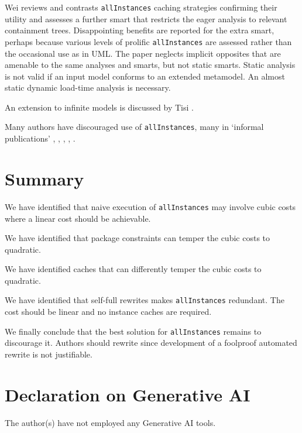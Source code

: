 \documentclass[
]{ceurart}
\begin{document}
Wei \cite{wei2015efficient} reviews and contrasts \verb!allInstances! caching strategies confirming their utility and assesses a further smart that restricts the eager analysis to relevant containment trees. Disappointing benefits are reported for the extra smart, perhaps because various levels of prolific \verb!allInstances! are assessed rather than the occasional use as in UML. The paper neglects implicit opposites that are amenable to the same analyses and smarts, but not static smarts. Static analysis is not valid if an input model conforms to an extended metamodel.  An almost static dynamic load-time analysis is necessary.

An extension to infinite models is discussed by Tisi \cite{tisi2015lazy}.

Many authors have discouraged use of \verb!allInstances!, many in `informal publications' \cite{edwBadAllInstances}, \cite{mikeBadAllInstances},  \cite{MossakowskiBadAllInstances},  \cite{chimiak2010teaching}, \cite{brucker2002note}.

\section{Summary}\label{Summary}

We have identified that naive execution of \verb!allInstances! may involve cubic costs where a linear cost should be achievable.

We have identified that package constraints can temper the cubic costs to quadratic.

We have identified caches that can differently temper the cubic costs to quadratic.

We have identified that self-full rewrites makes \verb!allInstances! redundant. The cost should be linear and no instance caches are required.

We finally conclude that the best solution for \verb!allInstances! remains to discourage it. Authors should rewrite since development of a foolproof automated rewrite is not justifiable.

\section*{Declaration on Generative AI}
  The author(s) have not employed any Generative AI tools.



\end{document}
